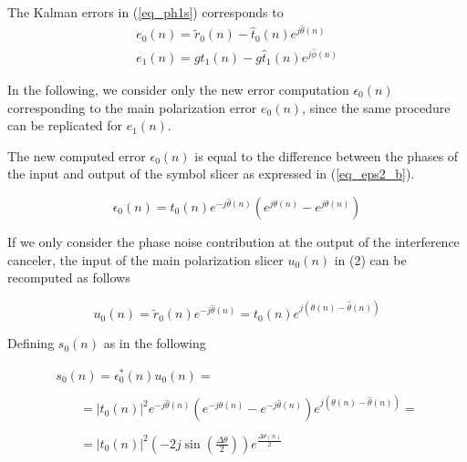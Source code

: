 The Kalman errors in (\ref{eq_ph1s}) corresponds to
\begin{equation}
\begin{array}{c}
e_0(n)=\tilde{r}_0(n)-\hat{t}_0(n)e^{j\hat{\theta}(n)}\\
e_1(n)=gt_1(n)-g\hat{t}_1(n)e^{j\hat{\phi}(n)}
\end{array}
\label{err01}
\end{equation}

In the following, we consider only the new error computation $\epsilon_0(n)$ corresponding to the main polarization error $e_0(n)$, since the same procedure can be replicated for $e_1(n)$.

The new computed error $\epsilon_0(n)$ is equal to the difference between the phases of the input and output of the symbol slicer as expressed in (\ref{eq_eps2_b}).

\begin{equation}
	\epsilon_0(n)=t_0(n)e^{-j\hat{\theta}(n)}(e^{j\theta(n)}-e^{j\hat{\theta}(n)})
	\label{eq_eps2_b}
\end{equation}

If we only consider the phase noise  contribution at the output of the interference canceler, the input of the main polarization slicer $u_0(n)$ in (2) can be recomputed as follows

\begin{equation}
u_0(n)=\tilde{r}_0(n)e^{-j\hat{\theta}(n)}=t_0(n)e^{j(\theta(n)-\hat{\theta}(n))}
\label{eq_s0_b}
\end{equation}
%
%
%

Defining $s_0(n)$ as in the following

\begin{equation}
\begin{array}{lll}
s_0(n)=\epsilon_0^*(n)u_0(n)=\\
\\
\phantom{xxii}=|t_0(n)|^2e^{-j\hat{\theta}(n)}(e^{-j\theta(n)}-e^{-j\hat{\theta}(n)})e^{j(\theta(n)-\hat{\theta}(n))}=\\
\\
\phantom{xxii}=|t_0(n)|^2\left(-2j\sin\left(\frac{\Delta\theta}{2}\right)\right)e^{\frac{\Delta\theta(n)}{2}} 
\end{array}
\label{eq_u_b}
\end{equation}

